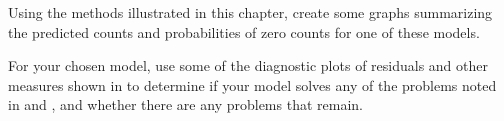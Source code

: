 \documentclass[10pt]{report}\usepackage[]{graphicx}\usepackage[]{color}
\begin{document}
\begin{Exercises}
\begin{enumerate*}
    \item Using the methods illustrated in this chapter, create some graphs summarizing the predicted counts
    and probabilities of zero counts for one of these models.
    \begin{ans}
    \end{ans}
    
    \item For your chosen model, use some of the diagnostic plots of residuals and other measures shown in
     to determine if your model solves any of the problems noted in 
    and , and whether there are any problems that remain.
    \begin{ans}
    \end{ans}
    
  \end{enumerate*}


\end{Exercises}
\end{document}
